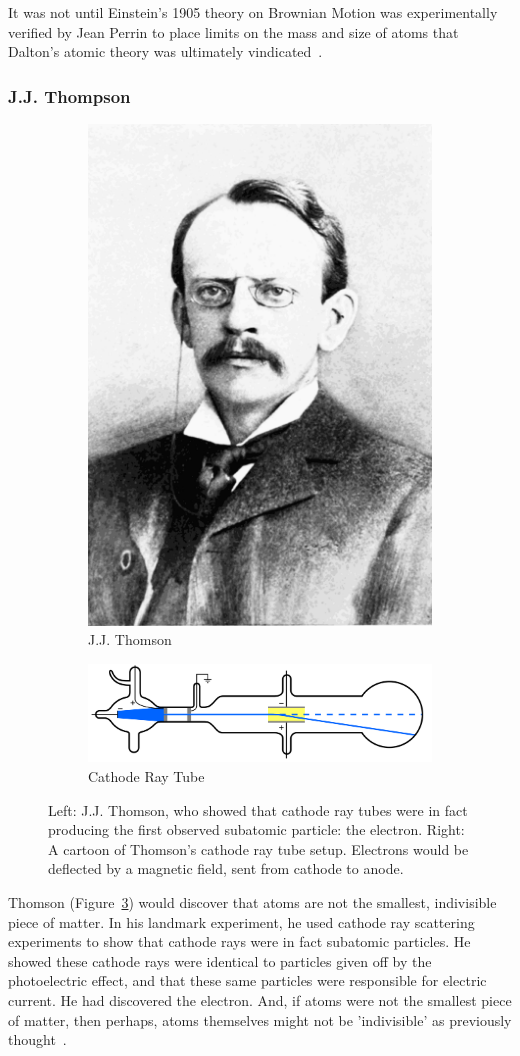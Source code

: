 It was not until Einstein's 1905 theory on Brownian Motion was experimentally
verified by Jean Perrin to place limits on the mass and size of atoms that
Dalton's atomic theory was ultimately vindicated~\cite{Patterson200750}.

\subsubsection{J.J. Thompson}

\begin{figure}[ht]
	\centering
	\begin{subfigure}{.4\textwidth}
		\centering
		\includegraphics[width=0.4\linewidth]{../Chapter2/fig/jjthomson.png}
		\caption{J.J. Thomson ~\cite{PopularScience1899}}
		\label{fig:thomsonportrait}
	\end{subfigure}%
	\begin{subfigure}{0.6\textwidth}
		\centering
		\includegraphics[width=0.4\linewidth]{../Chapter2/fig/cathoderaytube.png}
		\caption{Cathode Ray Tube ~\cite{Kurzon2010}}
		\label{fig:thomsoncathode}
	\end{subfigure}
	\caption{ 
		Left: J.J. Thomson, who showed that cathode ray tubes were in fact producing
		the first observed subatomic particle: the electron. Right: A cartoon of
		Thomson's cathode ray tube setup. Electrons would be deflected by a magnetic
		field, sent from cathode to anode.
	}
	\label{fig:jjthomson}
\end{figure}

Thomson (Figure~\ref{fig:jjthomson}) would discover that atoms are not the
smallest, indivisible piece of matter. In his landmark experiment, he used
cathode ray scattering experiments to show that cathode rays were in fact
subatomic particles. He showed these cathode rays were identical to particles
given off by the photoelectric effect, and that these same particles were
responsible for electric current. He had discovered the electron. And, if atoms
were not the smallest piece of matter, then perhaps, atoms themselves might not
be 'indivisible' as previously thought~\cite{nobelthomson2014}.

